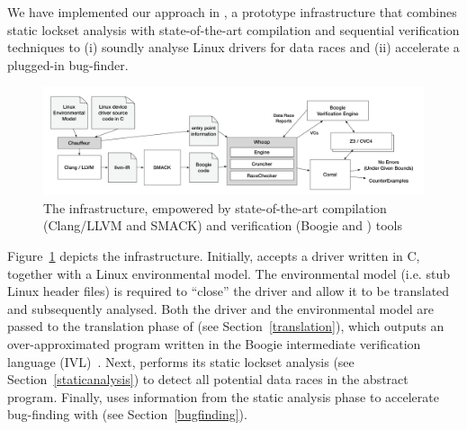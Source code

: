 We have implemented our approach in \whoop, a prototype infrastructure that combines static lockset analysis with state-of-the-art compilation and sequential verification techniques to (i) soundly analyse Linux drivers for data races and (ii) accelerate a plugged-in bug-finder.

\begin{figure}
\centering
\includegraphics[width=.99\linewidth]{img/whoop.pdf}
\caption{The \whoop infrastructure, empowered by state-of-the-art compilation (Clang/LLVM and SMACK) and verification (Boogie and \corral) tools}
\label{fig:whoop}
\end{figure}

Figure~\ref{fig:whoop} depicts the \whoop infrastructure. Initially, \whoop accepts a driver written in C, together with a Linux environmental model. The environmental model (i.e. stub Linux header files) is required to ``close'' the driver and allow it to be translated and subsequently analysed. Both the driver and the environmental model are passed to the translation phase of \whoop (see Section~\ref{translation}), which outputs an over-approximated program written in the Boogie intermediate verification language (IVL)~\cite{deline2005boogiepl}. Next, \whoop performs its static lockset analysis (see Section~\ref{staticanalysis}) to detect all potential data races in the abstract program. Finally, \whoop uses information from the static analysis phase to accelerate bug-finding with \corral (see Section~\ref{bugfinding}).